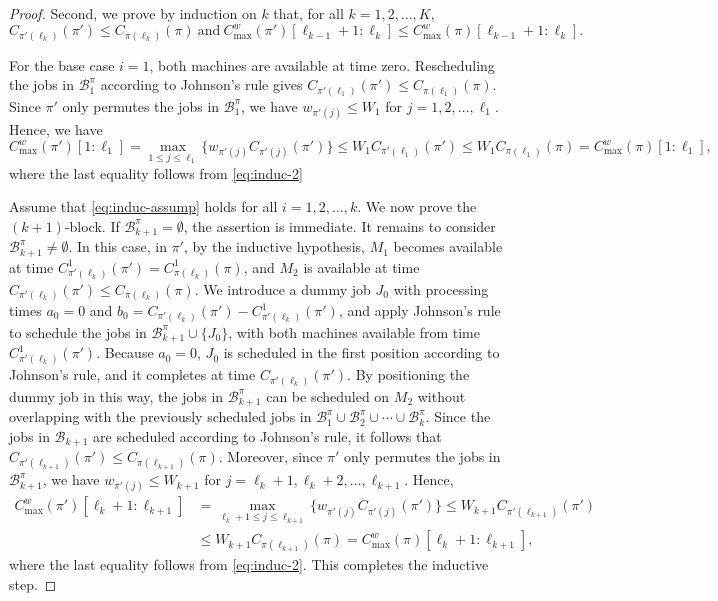 \documentclass[12pt]{article}
\begin{document}
\begin{sloppypar}
\begin{proof}
            Second, we prove by induction on $k$ that, for all $k=1, 2, \ldots, K$, 
            \begin{equation} \label{eq:induc-assump}
                C_{\pi'(\ell_k)} (\pi') \leq C_{\pi(\ell_k)}(\pi) ~ \mathrm{and}  ~ C_{\max}^w(\pi')[\ell_{k-1}+1:\ell_k] \leq C_{\max}^w(\pi)[\ell_{k-1}+1:\ell_k].
            \end{equation} 
            
            For the base case $i=1$, both machines are available at time zero. Rescheduling the jobs in $\mathcal{B}_1^{\pi}$ according to Johnson's rule gives $C_{\pi'(\ell_1)}(\pi') \leq C_{\pi(\ell_1)}(\pi)$. Since $\pi'$ only permutes the jobs in $\mathcal{B}_1^{\pi}$, we have $w_{\pi'(j)} \leq W_1$ for $j=1, 2, \ldots, \ell_1$. Hence, we have 
            \begin{equation*}
                C_{\max}^w(\pi')[1:\ell_1]= \max_{1 \leq j \leq \ell_1}\{w_{\pi'(j)}C_{\pi'(j)}(\pi')\} \leq W_1 C_{\pi'(\ell_1)}(\pi') \leq W_1 C_{\pi(\ell_1)}(\pi)=C_{\max}^w(\pi)[1:\ell_1],
            \end{equation*}
            where the last equality follows from \cref{eq:induc-2}
            
            Assume that \cref{eq:induc-assump} holds for all $i=1, 2, \ldots, k$. We now prove the $(k+1)$-block. If $\mathcal{B}_{k+1}^{\pi}=\emptyset$, the assertion is immediate. It remains to consider $\mathcal{B}_{k+1}^{\pi} \neq \emptyset$. In this case, in $\pi'$, by the inductive hypothesis, $M_1$ becomes available at time $C_{\pi'(\ell_k)}^1(\pi')=C_{\pi(\ell_k)}^1(\pi)$, and $M_2$ is available at time $C_{\pi'(\ell_k)}(\pi') \leq C_{\pi(\ell_k)}(\pi)$. We introduce a dummy job $J_0$ with processing times $a_0=0$ and $b_0=C_{\pi'(\ell_k)}(\pi')-C_{\pi'(\ell_k)}^1(\pi')$, and apply Johnson's rule to schedule the jobs in $\mathcal{B}_{k+1}^{\pi} \cup \{J_0\}$, with both machines available from time $C_{\pi'(\ell_k)}^1(\pi')$. Because $a_0=0$, $J_0$ is scheduled in the first position according to Johnson's rule, and it completes at time $C_{\pi'(\ell_k)}(\pi')$. By positioning the dummy job in this way, the jobs in $\mathcal{B}_{k+1}^{\pi}$ can be scheduled on $M_2$ without overlapping with the previously scheduled jobs in $\mathcal{B}_1^{\pi} \cup \mathcal{B}_2^{\pi} \cup \cdots \cup \mathcal{B}_k^{\pi}$. Since the jobs in $\mathcal{B}_{k+1}$ are scheduled according to Johnson's rule, it follows that $C_{\pi'(\ell_{k+1})} (\pi') \leq C_{\pi(\ell_{k+1})}(\pi)$. Moreover, since $\pi'$ only permutes the jobs in $\mathcal{B}_{k+1}^{\pi}$, we have $w_{\pi'(j)} \leq W_{k+1}$ for $j=\ell_k+1, \ell_k+2, \ldots, \ell_{k+1}$. Hence, 
            \begin{align*}
                C_{\max}^w(\pi')[\ell_k+1:\ell_{k+1}] & = \max_{\ell_k+1 \leq j \leq \ell_{k+1}}\{w_{\pi'(j)}C_{\pi'(j)}(\pi')\} \leq W_{k+1} C_{\pi'(\ell_{k+1})}(\pi') \\
                & \leq W_{k+1} C_{\pi(\ell_{k+1})}(\pi)=C_{\max}^w(\pi)[\ell_k+1:\ell_{k+1}],
            \end{align*}
            where the last equality follows from \cref{eq:induc-2}. This completes the inductive step. 
            

\end{proof}
\end{sloppypar}
\end{document}
